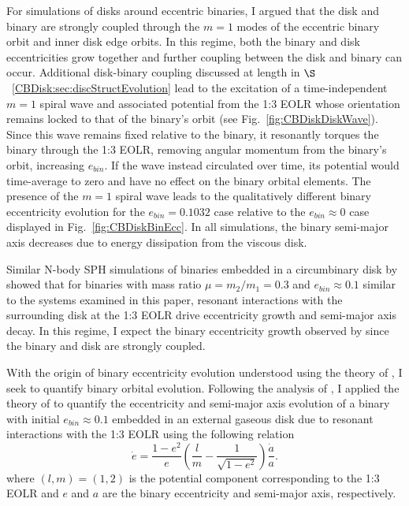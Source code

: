 For simulations of disks around eccentric binaries, I argued that the disk and binary are strongly coupled through the $m = 1$ modes of the eccentric binary orbit and inner disk edge orbits.  In this regime, both the binary and disk eccentricities grow together and further coupling between the disk and binary can occur.  Additional disk-binary coupling discussed at length in $\S$~\ref{CBDisk:sec:discStructEvolution} lead to the excitation of a time-independent $m = 1$ spiral wave and associated potential from the 1:3 EOLR whose orientation remains locked to that of the binary's orbit (see Fig.~\ref{fig:CBDiskDiskWave}).  Since this wave remains fixed relative to the binary, it resonantly torques the binary through the 1:3 EOLR, removing angular momentum from the binary's orbit, increasing $e_{bin}$.  If the wave instead circulated over time, its potential would time-average to zero and have no effect on the binary orbital elements.  The presence of the $m = 1$ spiral wave leads to the qualitatively different binary eccentricity evolution for the $e_{bin} = 0.1032$ case relative to the $e_{bin} \approx 0$ case displayed in Fig.~\ref{fig:CBDiskBinEcc}.  In all simulations, the binary semi-major axis decreases due to energy dissipation from the viscous disk. 

 Similar N-body SPH simulations of
binaries embedded in a circumbinary disk by \citet{Artymowicz1991} showed that for binaries with mass ratio $\mu = m_2/m_1 = 0.3$ and $e_{bin} \approx 0.1$ similar to the systems examined in this paper, resonant interactions with the surrounding disk at the 1:3 EOLR drive eccentricity growth and semi-major axis decay.  In this regime, I expect the binary eccentricity growth observed by \citet{Artymowicz1991} since the binary and disk are strongly coupled.

With the origin of binary eccentricity evolution understood using
the theory of \citet{Papaloizou2001}, I seek to quantify binary orbital
evolution.  Following the analysis of \citet{Dermine2013}, I applied the theory of \citet{Artymowicz1996b,Artymowicz2000} to quantify the eccentricity and semi-major axis 
evolution of a binary with initial $e_{bin} \approx 0.1$ embedded in an external gaseous disk due to resonant interactions with the 1:3 EOLR using the following 
relation
\begin{equation} 
\label{CBDisk:eqn:deda}
\dot{e} = \frac{1 - e^2}{e} \left(\frac{l}{m} - \frac{1}{\sqrt{1 - e^2}}\right)\frac{\dot{a}}{a}.
\end{equation}
where $(l,m) = (1,2)$ is the potential component corresponding to the 1:3 EOLR \citep{Artymowicz1991,Artymowicz2000} and $e$ and $a$ are the binary eccentricity and semi-major axis, respectively.

